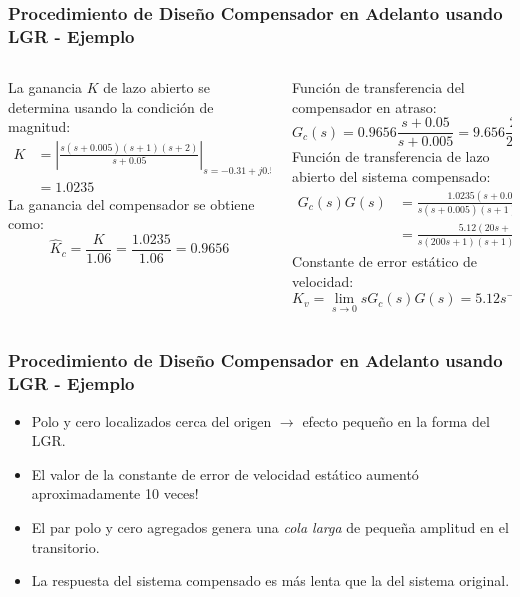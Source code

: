 \documentclass[aspectratio=169,handout]{beamer}
\theoremstyle{definition}
\theoremstyle{plain}
\theoremstyle{remark}
\begin{document}
\begin{frame}[c]\frametitle{Procedimiento de Diseño Compensador en Adelanto usando LGR - Ejemplo}
	\small
	\vspace*{3mm}
	\begin{columns}
		\begin{column}{0.5\textwidth}
			La ganancia $K$ de lazo abierto se determina usando la condición de magnitud:
			\begin{align*}
				K &= \left| \frac{s(s+0.005)(s+1)(s+2)}{s+0.05} \right|_{s=-0.31+j0.55}\\
				&= 1.0235
			\end{align*}
			\pause
			La ganancia del compensador se obtiene como:
			\begin{equation*}
				\hat{K}_c = \frac{K}{1.06} = \frac{1.0235}{1.06} = 0.9656
			\end{equation*}
			\pause
		\end{column}
		\begin{column}{0.5\textwidth}
			Función de transferencia del compensador en atraso:
			\begin{equation*}
				G_c(s) = 0.9656\frac{s+0.05}{s+0.005} = 9.656\frac{20s+1}{200s+1}
			\end{equation*}
			\pause
			Función de transferencia de lazo abierto del sistema compensado:
			\begin{align*}
				G_c(s)G(s) &= \frac{1.0235(s+0.05)}{s(s+0.005)(s+1)(s+2)}\\
				&= \frac{5.12(20s+1)}{s(200s+1)(s+1)(0.5s+1)}
			\end{align*}
			\pause
			Constante de error estático de velocidad:
			\begin{equation*}
				K_v = \lim_{s \rightarrow 0}sG_c(s)G(s) = 5.12 s^{-1}
			\end{equation*}
		\end{column}
	\end{columns}
\end{frame}

\begin{frame}[<+->]\frametitle{Procedimiento de Diseño Compensador en Adelanto usando LGR - Ejemplo}
	\begin{itemize}
		\item Polo y cero localizados cerca del origen $\rightarrow$ efecto pequeño en la forma del LGR.
		\item El valor de la constante de error de velocidad estático aumentó aproximadamente 10 veces!
		\item El par polo y cero agregados genera una \textit{cola larga} de pequeña amplitud en el transitorio.
		\item La respuesta del sistema compensado es más lenta que la del sistema original.
	\end{itemize}
\end{frame}
\end{document}
